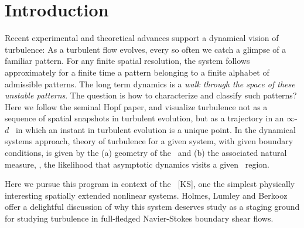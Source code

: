 

\section{Introduction}

Recent experimental and theoretical advances
support a dynamical vision of turbulence:
As a turbulent flow evolves,
every so often we catch a glimpse of a familiar pattern.
For any finite  spatial resolution,
the system follows approximately for a finite time
a pattern belonging to a
{ finite alphabet}
of admissible patterns.
The long term dynamics is
a {\em walk through the space of these unstable patterns}.
The question is how to characterize and classify such patterns?
Here we follow the seminal Hopf paper, and  visualize
turbulence not as  a sequence of
spatial snapshots in turbulent evolution,
but as a trajectory in an
 $\infty$-$d$ \statesp\ in which an
instant in turbulent evolution is
a {unique} point. In the dynamical systems approach,
theory of turbulence for a given system, with given boundary conditions,
is given by the
(a) geometry of the \statesp\ and (b) the associated natural measure,
\ie,
the likelihood that asymptotic dynamics visits a given \statesp\ region.

Here we pursue this program in context of
the \KSe\ [KS], %
one the
simplest physically interesting spatially extended nonlinear systems.
Holmes, Lumley
and Berkooz offer a delightful discussion of why this system
deserves study as a staging ground for studying turbulence in
full-fledged Navier-Stokes boundary shear flows.

